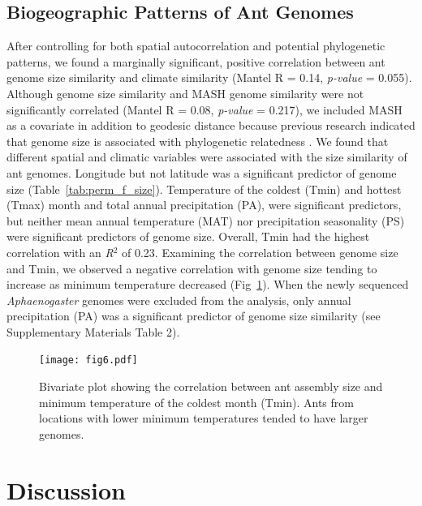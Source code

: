 \documentclass[fleqn,10pt,lineno]{wlpeerj} %
\begin{document}
\subsection*{Biogeographic Patterns of Ant Genomes}




After controlling for both spatial autocorrelation and potential
phylogenetic patterns, we found a marginally significant, positive
correlation between ant genome size similarity and climate similarity
(Mantel R = 0.14, \textit{p-value} = 0.055). Although genome size
similarity and MASH genome similarity were not significantly
correlated (Mantel R = 0.08, \textit{p-value} = 0.217), we included
MASH as a covariate in addition to geodesic distance because previous
research indicated that genome size is associated with phylogenetic
relatedness \citep{Alfsnes2017}. We found that different spatial and
climatic variables were associated with the size similarity of ant
genomes. Longitude but not latitude was a significant predictor of
genome size (Table~\ref{tab:perm_f_size}). Temperature of the coldest
(Tmin) and hottest (Tmax) month and total annual precipitation (PA),
were significant predictors, but neither mean annual temperature (MAT)
nor precipitation seasonality (PS) were significant predictors of
genome size. Overall, Tmin had the highest correlation with an
\textit{R}$^2$ of 0.23. Examining the correlation between genome size
and Tmin, we observed a negative correlation with genome size tending
to increase as minimum temperature decreased
(Fig~\ref{fig:size_tmin}). When the newly sequenced
\textit{Aphaenogaster} genomes were excluded from the analysis, only
annual precipitation (PA) was a significant predictor of genome size
similarity (see Supplementary Materials
Table 2).



\begin{figure}[ht]
\texttt{[image: fig6.pdf]}
\caption{Bivariate plot showing the correlation between ant assembly
  size and minimum temperature of the coldest month (Tmin). Ants from
  locations with lower minimum temperatures tended to have larger
  genomes.}
\label{fig:size_tmin}
\end{figure}


\newpage
\clearpage

\section*{Discussion}
\end{document}
